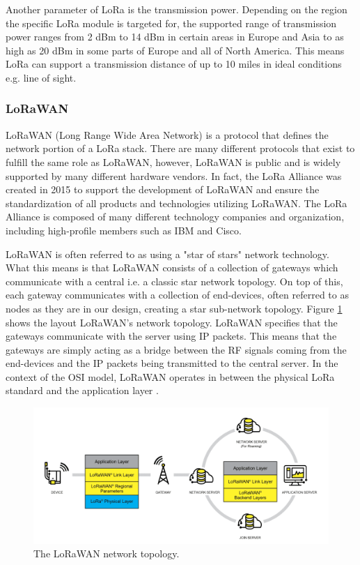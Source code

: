 Another parameter of LoRa is the transmission power. Depending on the region the specific LoRa module is targeted for, the supported range of transmission power ranges from 2 dBm to 14 dBm in certain areas in Europe and Asia to as high as 20 dBm in some parts of Europe and all of North America. This means LoRa can support a transmission distance of up to 10 miles in ideal conditions e.g. line of sight.

\subsubsection{LoRaWAN}
LoRaWAN (Long Range Wide Area Network) is a protocol that defines the network portion of a LoRa stack. There are many different protocols that exist to fulfill the same role as LoRaWAN, however, LoRaWAN is public and is widely supported by many different hardware vendors. In fact, the LoRa Alliance was created in 2015 to support the development of LoRaWAN and ensure the standardization of all products and technologies utilizing LoRaWAN. The LoRa Alliance is composed of many different technology companies and organization, including high-profile members such as IBM and Cisco.

LoRaWAN is often referred to as using a "star of stars" network technology. What this means is that LoRaWAN consists of a collection of gateways which communicate with a central i.e. a classic star network topology. On top of this, each gateway communicates with a collection of end-devices, often referred to as nodes as they are in our design, creating a star sub-network topology. Figure \ref{lorawan-network-stack} shows the layout LoRaWAN's network topology. LoRaWAN specifies that the gateways communicate with the server using IP packets. This means that the gateways are simply acting as a bridge between the RF signals coming from the end-devices and the IP packets being transmitted to the central server. In the context of the OSI model, LoRaWAN operates in between the physical LoRa standard and the application layer \cite{lora-alliance}.

\begin{figure}
    \centering
    \includegraphics[width=6in]{figures/lorawan-stack.png}
    \caption{The LoRaWAN network topology.}
    \label{lorawan-network-stack}
\end{figure}

